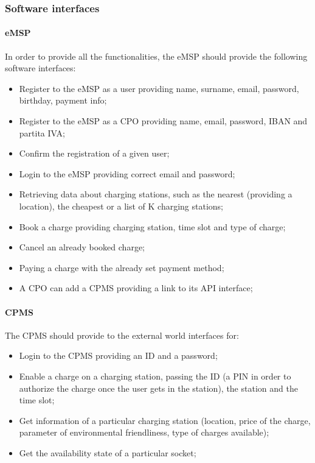 \subsubsection{Software interfaces}
\paragraph{\ac{eMSP}}
In order to provide all the functionalities, the \ac{eMSP} should provide the following software interfaces:
\begin{itemize}
    \item Register to the \ac{eMSP} as a user providing name, surname, email, password, birthday, payment info;
    \item Register to the \ac{eMSP} as a \ac{CPO} providing name, email, password, \ac{IBAN} and \gls{partita IVA};
    \item Confirm the registration of a given user;
    \item Login to the \ac{eMSP} providing correct email and password;
    \item Retrieving data about charging stations, such as the nearest (providing a location), the cheapest or a list of K charging stations;
    \item Book a charge providing charging station, time slot and type of charge;
    \item Cancel an already booked charge;
    \item Paying a charge with the already set payment method;
    \item A \ac{CPO} can add a \ac{CPMS} providing a link to its \ac{API} interface;
\end{itemize}

\paragraph{\ac{CPMS}}
The \ac{CPMS} should provide to the external world interfaces for:
\begin{itemize}
    \item Login to the \ac{CPMS} providing an ID and a password;
    \item Enable a charge on a charging station, passing the ID (a PIN in order to authorize the charge once the user gets in the station), the station and the time slot;
    \item Get information of a particular charging station (location, price of the charge, parameter of environmental friendliness, type of charges available);
    \item Get the availability state of a particular socket;
\end{itemize}


